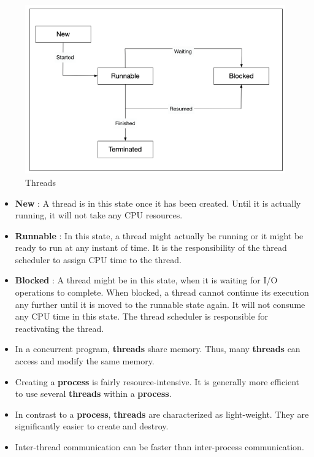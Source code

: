 \documentclass[11pt, a4paper]{article}
\begin{document}
\begin{figure}[htpb!]
	\centering
	\includegraphics[width=0.8\linewidth]{threads}
	\caption{Threads}
	\label{fig:threads}
\end{figure}


\begin{itemize}
	\item \textbf{New} : A thread is in this state once it has been created. Until it is actually running, it will not take any CPU resources.
	\item \textbf{Runnable} : In this state, a thread might actually be running or it might be ready to run at any instant of time. It is the responsibility of the thread scheduler to assign CPU time to the thread.
	\item \textbf{Blocked} : A thread might be in this state, when it is waiting for I/O operations to complete. When blocked, a thread cannot continue its execution any further until it is moved to the runnable state again. It will not consume any CPU time in this state. The thread scheduler is responsible for reactivating the thread.
\end{itemize}




\begin{itemize}
	\item In a concurrent program, \textbf{threads} share memory. Thus, many \textbf{threads} can access and modify the same memory.
	\item Creating a \textbf{process} is fairly resource-intensive. It is generally more efficient to use several \textbf{threads} within a \textbf{process}.
	\item In contrast to a \textbf{process}, \textbf{threads} are characterized as light-weight. They are significantly easier to create and destroy.
	\item Inter-thread communication can be faster than inter-process communication.
\end{itemize}
\end{document}
